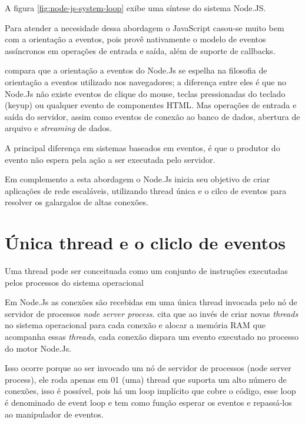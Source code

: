   A figura \ref{fig:node-js-system-loop} exibe uma síntese do sistema Node.JS.
  
  Para atender a necesidade dessa abordagem o JavaScript casou-se muito bem com a orientação a eventos, pois provê nativamente
  o modelo de eventos assíncronos em operações de entrada e saída, além de suporte de callbacks.\cite{Oliveira:2012}

   compara que a orientação a eventos do Node.Js se espelha na filosofia de orientação 
  a eventos utilizado nos navegadores; a diferença entre eles é que no Node.Js 
  não existe eventos de clique do mouse, teclas pressionadas do teclado (keyup) ou qualquer evento de componentes HTML. Mas operações
  de entrada e saída do servidor, assim como eventos de conexão ao banco de dados, abertura de arquivo e \textit{streaming}
  de dados.
  
  A principal diferença em sistemas baseados em eventos, é que o produtor do evento não espera pela ação a ser executada
  pelo servidor. \cite{Junior:2012}    

  Em complemento a esta abordagem o Node.Js inicia seu objetivo de criar aplicações de rede escaláveis, utilizando thread única
  e o cilco de eventos para resolver os galargalos de altas conexões.

\section{Única thread e o cliclo de eventos}
\label{single-thread}

  Uma thread pode ser conceituada como um conjunto de instruções executadas pelos processos do sistema operacional
  
  Em Node.Js as conexões são recebidas em uma única thread invocada pelo nó de servidor de processos \textit{node server process}.
   cita que ao invés de criar novas \textit{threads}
  no sistema operacional para cada conexão e alocar a memória RAM que acompanha essas \textit{threads}, 
  cada conexão dispara um evento executado no processo do motor Node.Js.
  
  Isso ocorre porque ao ser invocado um nó de servidor de processos (node server
  process), ele roda apenas em 01 (uma) thread que suporta um alto número de conexões, isso é
  possível, pois há um loop implícito que cobre o código, esse loop é denominado de event loop
  e tem como função esperar os eventos e repassá-los ao manipulador de eventos. \cite{Tilkov:2010}
  
